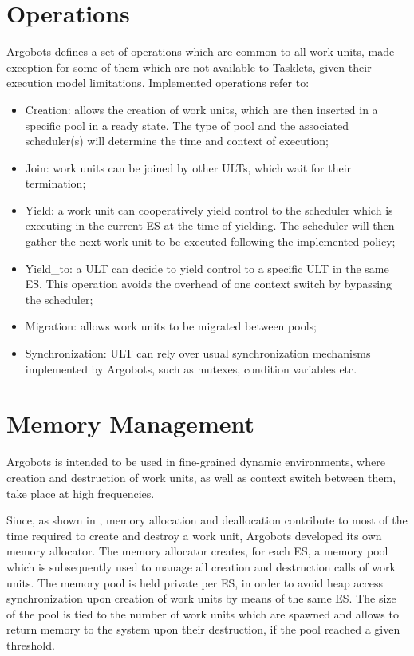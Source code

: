 \section{Operations}
Argobots defines a set of operations which are common to all work units, made exception for some of them which are not available to Tasklets, given their execution model limitations. Implemented operations refer to:
\begin{itemize}
    \item Creation: allows the creation of work units, which are then inserted in a specific pool in a ready state. The type of pool and the associated scheduler(s) will determine the time and context of execution;
    \item Join: work units can be joined by other ULTs, which wait for their termination;
    \item Yield: a work unit can cooperatively yield control to the scheduler which is executing in the current ES at the time of yielding. The scheduler will then gather the next work unit to be executed following the implemented policy;
    \item Yield\_to: a ULT can decide to yield control to a specific ULT in the same ES. This operation avoids the overhead of one context switch by bypassing the scheduler;
    \item Migration: allows work units to be migrated between pools;
    \item Synchronization: ULT can rely over usual synchronization mechanisms implemented by Argobots, such as mutexes, condition variables etc.
\end{itemize}

\section{Memory Management}
Argobots is intended to be used in fine-grained dynamic environments, where creation and destruction of work units, as well as context switch between them, take place at high frequencies.\newline

Since, as shown in \cite{argobots-paper}, memory allocation and deallocation contribute to most of the time required to create and destroy a work unit, Argobots developed its own memory allocator. The memory allocator creates, for each ES, a memory pool which is subsequently used to manage all creation and destruction calls of work units. The memory pool is held private per ES, in order to avoid heap access synchronization upon creation of work units by means of the same ES. The size of the pool is tied to the number of work units which are spawned and allows to return memory to the system upon their destruction, if the pool reached a given threshold.\newline

